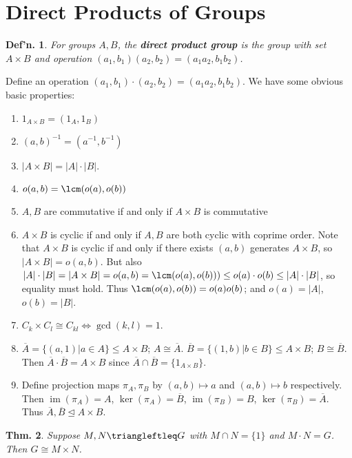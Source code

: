 \documentclass[12pt, a4paper]{book}
\DeclareMathOperator{\im}{im}
\newtheorem{theorem}{Thm.}[section]
\newtheorem{definition}[theorem]{Def'n.}
\theoremstyle{nonumberplain}
\begin{document}
\section{Direct Products of Groups}
\begin{definition}
    For groups $A,B$, the \textbf{direct product group} is the group with set $A\times B$ and operation $(a_1,b_1)(a_2,b_2)=(a_1a_2,b_1b_2)$.
\end{definition}
Define an operation $(a_1,b_1)\cdot(a_2,b_2)=(a_1a_2,b_1b_2)$.
We have some obvious basic properties:
\begin{enumerate}
    \item $1_{A\times B}=(1_A,1_B)$
    \item $(a,b)^{-1}=(a^{-1},b^{-1})$
    \item $|A\times B|=|A|\cdot|B|$.
    \item $o(a,b)=\lcm(o(a),o(b))$
    \item $A,B$ are commutative if and only if $A\times B$ is commutative
    \item $A\times B$ is cyclic if and only if $A,B$ are both cyclic with coprime order.
        Note that $A\times B$ is cyclic if and only if there exists $(a,b)$ generates $A\times B$, so $|A\times B|=o(a,b)$.
        But also $|A|\cdot|B|=|A\times B|=o(a,b)=\lcm(o(a),o(b)))\leq o(a)\cdot o(b)\leq|A|\cdot|B|$, so equality must hold.
        Thus $\lcm(o(a),o(b))=o(a)o(b)$; and $o(a)=|A|$, $o(b)=|B|$.
    \item $C_k\times C_l\cong C_{kl}\Longleftrightarrow\gcd(k,l)=1$.
    \item $\overline{A}=\{(a,1)|a\in A\}\leq A\times B$; $A\cong\overline{A}$.
        $\overline{B}=\{(1,b)|b\in B\}\leq A\times B$; $B\cong\overline{B}$.
        Then $\overline{A}\cdot\overline{B}=A\times B$ since $\overline{A}\cap\overline{B}=\{1_{A\times B}\}$.
    \item Define projection maps $\pi_A,\pi_B$ by $(a,b)\mapsto a$ and $(a,b)\mapsto b$ respectively.
        Then $\im(\pi_A)=A$, $\ker(\pi_A)=\overline{B}$, $\im(\pi_B)=B$, $\ker(\pi_B)=\overline{A}$.
        Thus $\overline{A},\overline{B}\trianglelefteq A\times B$.
\end{enumerate}
\begin{theorem}
    Suppose $M,N\triangleftleq G$ with $M\cap N=\{1\}$ and $M\cdot N=G$.
    Then $G\cong M\times N$.
\end{theorem}
\end{document}
